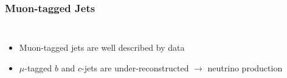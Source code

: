 \begin{frame}

  \frametitle{\textbf{Muon-tagged Jets}}

  \begin{columns}
    \centering
    \begin{itemize}
    \item Muon-tagged jets are well described by data
    \item $\mu$-tagged $b$ and $c$-jets are under-reconstructed $\to$ neutrino production
    \end{itemize}
  \end{columns}

  \begin{columns}
    \centering
  \end{columns}





\end{frame}

